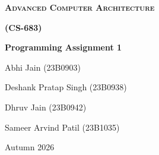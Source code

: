 \documentclass[11pt]{article}
\newcommand{\StudentOne}{Abhi Jain (23B0903)}
\newcommand{\StudentTwo}{Deshank Pratap Singh (23B0938)}
\newcommand{\StudentThree}{Dhruv Jain (23B0942)}
\newcommand{\StudentFour}{Sameer Arvind Patil (23B1035)}
\begin{document}

\begin{titlepage}
    \centering
    {\scshape\bfseries\Huge Advanced Computer Architecture\par}
    \vspace{0.2cm}
    {\scshape\bfseries\Huge (CS-683)\par}
    \vspace{0.8cm}
    {\huge \textbf{Programming Assignment 1}\par}
    \vspace{1cm}

    {\Large \StudentOne\par}
    {\Large \StudentTwo\par}
    {\Large \StudentThree\par}
    {\Large \StudentFour\par}

    \vfill
    {\large Autumn 2026\par}
\end{titlepage}

\tableofcontents
\clearpage



\clearpage


\clearpage


\end{document}
